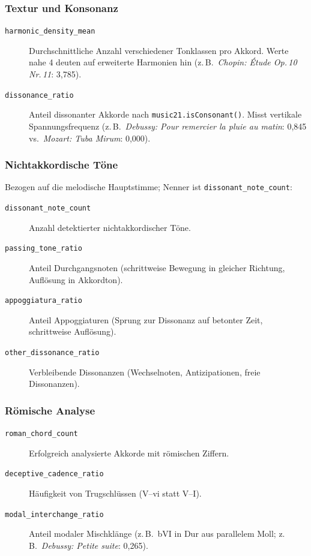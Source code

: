 \documentclass[10pt,a4paper]{article}
\theoremstyle{definition}
\begin{document}
\subsubsection*{Textur und Konsonanz}
\begin{description}
    \item[\texttt{harmonic\_density\_mean}] Durchschnittliche Anzahl verschiedener Tonklassen pro Akkord. Werte nahe 4 deuten auf erweiterte Harmonien hin (z.\,B.\ \emph{Chopin: Étude Op.\,10 Nr.\,11}: 3{,}785).
    
    \item[\texttt{dissonance\_ratio}] Anteil dissonanter Akkorde nach \texttt{music21.isConsonant()}. Misst vertikale Spannungsfrequenz (z.\,B.\ \emph{Debussy: Pour remercier la pluie au matin}: 0{,}845 vs.\ \emph{Mozart: Tuba Mirum}: 0{,}000).
\end{description}

\subsubsection*{Nichtakkordische Töne}
Bezogen auf die melodische Hauptstimme; Nenner ist \texttt{dissonant\_note\_count}:
\begin{description}
    \item[\texttt{dissonant\_note\_count}] Anzahl detektierter nichtakkordischer Töne.
    
    \item[\texttt{passing\_tone\_ratio}] Anteil Durchgangsnoten (schrittweise Bewegung in gleicher Richtung, Auflösung in Akkordton).
    
    \item[\texttt{appoggiatura\_ratio}] Anteil Appoggiaturen (Sprung zur Dissonanz auf betonter Zeit, schrittweise Auflösung).
    
    \item[\texttt{other\_dissonance\_ratio}] Verbleibende Dissonanzen (Wechselnoten, Antizipationen, freie Dissonanzen).
\end{description}

\subsubsection*{Römische Analyse}
\begin{description}
    \item[\texttt{roman\_chord\_count}] Erfolgreich analysierte Akkorde mit römischen Ziffern.
    
    \item[\texttt{deceptive\_cadence\_ratio}] Häufigkeit von Trugschlüssen (V--vi statt V--I).
    
    \item[\texttt{modal\_interchange\_ratio}] Anteil modaler Mischklänge (z.\,B.\ bVI in Dur aus parallelem Moll; z.\,B.\ \emph{Debussy: Petite suite}: 0{,}265).
\end{description}
\end{document}
